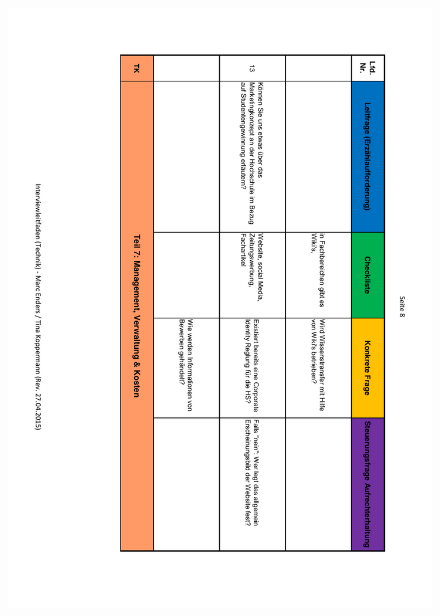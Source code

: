\begin{figure}
	\centering
	\includegraphics[width=18cm]{kapitel/anhang/Interviewleitfaden_8}
\end{figure}


